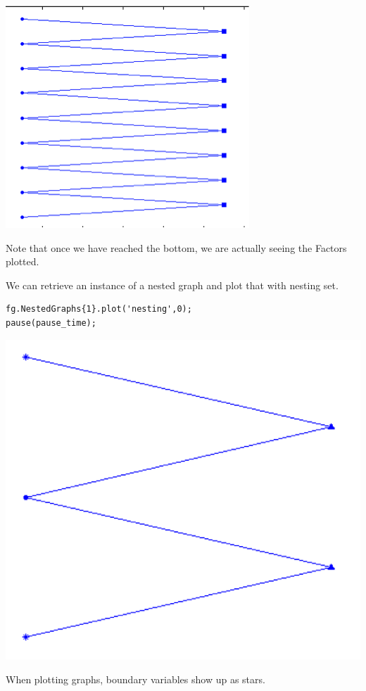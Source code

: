 \includegraphics{images/plot12.png}
 
Note that once we have reached the bottom, we are actually seeing the Factors plotted.
 
We can retrieve an instance of a nested graph and plot that with nesting set.

\begin{lstlisting}
fg.NestedGraphs{1}.plot('nesting',0);
pause(pause_time);
\end{lstlisting}



\includegraphics{images/plot13.png}
 
 
When plotting graphs, boundary variables show up as stars.

